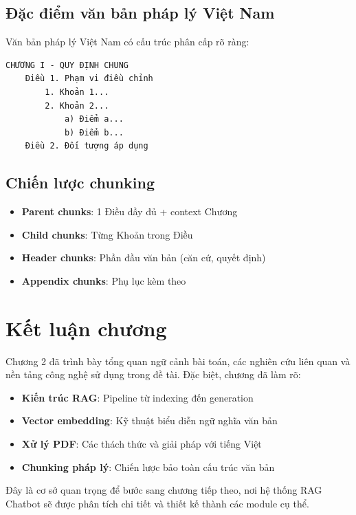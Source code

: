 \documentclass[../DoAn.tex]{subfiles}
\begin{document}
\subsection{Đặc điểm văn bản pháp lý Việt Nam}
Văn bản pháp lý Việt Nam có cấu trúc phân cấp rõ ràng:
\begin{verbatim}
CHƯƠNG I - QUY ĐỊNH CHUNG
    Điều 1. Phạm vi điều chỉnh
        1. Khoản 1...
        2. Khoản 2...
            a) Điểm a...
            b) Điểm b...
    Điều 2. Đối tượng áp dụng
\end{verbatim}

\subsection{Chiến lược chunking}
\begin{itemize}
    \item \textbf{Parent chunks}: 1 Điều đầy đủ + context Chương
    \item \textbf{Child chunks}: Từng Khoản trong Điều
    \item \textbf{Header chunks}: Phần đầu văn bản (căn cứ, quyết định)
    \item \textbf{Appendix chunks}: Phụ lục kèm theo
\end{itemize}

\section{Kết luận chương}
Chương 2 đã trình bày tổng quan ngữ cảnh bài toán, các nghiên cứu liên quan và nền tảng công nghệ sử dụng trong đề tài. Đặc biệt, chương đã làm rõ:
\begin{itemize}
    \item \textbf{Kiến trúc RAG}: Pipeline từ indexing đến generation
    \item \textbf{Vector embedding}: Kỹ thuật biểu diễn ngữ nghĩa văn bản
    \item \textbf{Xử lý PDF}: Các thách thức và giải pháp với tiếng Việt
    \item \textbf{Chunking pháp lý}: Chiến lược bảo toàn cấu trúc văn bản
\end{itemize}

Đây là cơ sở quan trọng để bước sang chương tiếp theo, nơi hệ thống RAG Chatbot sẽ được phân tích chi tiết và thiết kế thành các module cụ thể.
\end{document}

